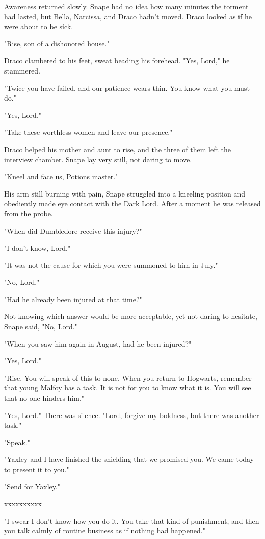 \documentclass[a4paper,11pt]{article}
\begin{document}
Awareness returned slowly. Snape had no idea how many minutes the torment had lasted, but Bella, Narcissa, and Draco hadn't moved. Draco looked as if he were about to be sick.

"Rise, son of a dishonored house."

Draco clambered to his feet, sweat beading his forehead. "Yes, Lord," he stammered.

"Twice you have failed, and our patience wears thin. You know what you must do."

"Yes, Lord."

"Take these worthless women and leave our presence."

Draco helped his mother and aunt to rise, and the three of them left the interview chamber. Snape lay very still, not daring to move.

"Kneel and face us, Potions master."

His arm still burning with pain, Snape struggled into a kneeling position and obediently made eye contact with the Dark Lord. After a moment he was released from the probe.

"When did Dumbledore receive this injury?"

"I don't know, Lord."

"It was not the cause for which you were summoned to him in July."

"No, Lord."

"Had he already been injured at that time?"

Not knowing which answer would be more acceptable, yet not daring to hesitate, Snape said, "No, Lord."

"When you saw him again in August, had he been injured?"

"Yes, Lord."

"Rise. You will speak of this to none. When you return to Hogwarts, remember that young Malfoy has a task. It is not for you to know what it is. You will see that no one hinders him."

"Yes, Lord." There was silence. "Lord, forgive my boldness, but there was another task."

"Speak."

"Yaxley and I have finished the shielding that we promised you. We came today to present it to you."

"Send for Yaxley."

xxxxxxxxxx

"I swear I don't know how you do it. You take that kind of punishment, and then you talk calmly of routine business as if nothing had happened."
\end{document}
